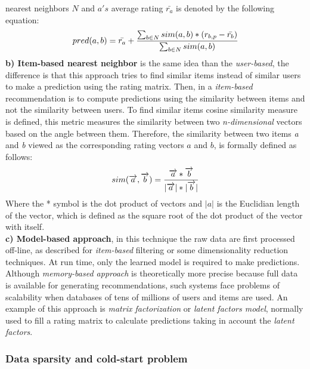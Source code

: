 nearest neighbors $N$ and $a's$ average rating $\bar{r_a}$ is denoted
by the following equation:
\begin{equation}\label{eq:prediction}
\displaystyle pred(a,b) = \bar{r_a} + 
{\sum_{b \in N} sim(a,b) * (r_{b,p}- \bar{r_b}) 
\over \sum_{b \in N} sim(a,b)} 
\end{equation}
\textbf{b) Item-based nearest neighbor} is the same idea than the \textit
{user-based}, the difference is that this approach tries to find
similar items instead of similar users to make a prediction using the rating
matrix. Then, in a \textit{item-based} recommendation is to compute
predictions using the similarity between items and not the similarity
between users. To find similar items cosine similarity measure is
defined, this metric measures the similarity between two
\textit{n-dimensional} vectors based on the angle between them.
Therefore, the similarity between two items \textit{a} and \textit{b}
viewed as the corresponding rating vectors $a$ and $b$, is formally
defined as follows:
\begin{equation}\label{eq:cosine}
\displaystyle sim(\overrightarrow{a},\overrightarrow{b})= 
{\overrightarrow{a}* \overrightarrow{b} \over
|\overrightarrow{a}|*|\overrightarrow{b}| }
\end{equation}
Where the * symbol is the dot product of vectors and $|a|$ is the Euclidian
length of the vector, which is defined as the square root of the dot
product of the vector with itself.\\

\textbf{c) Model-based approach}, in this technique  the raw data are
first processed off-line, as described for \textit {item-based}
filtering or some dimensionality reduction techniques. At run time,
only the learned model is required to make predictions. Although
\textit{memory-based approach} is theoretically more precise because
full data is available for generating recommendations, such systems
face problems of scalability when databases of tens of millions of
users and items are used. An example of this approach is
\textit{matrix factorization} or \textit{latent factors model},
normally used to fill a rating matrix to calculate predictions taking
in account the \textit{latent factors}.

\subsubsection{Data sparsity and cold-start problem}\label{coldstart}

